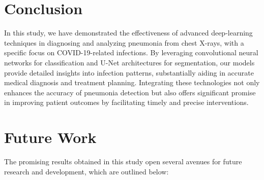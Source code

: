 \documentclass[10pt]{article}
\begin{document}
\section*{Conclusion}
\label{sec:conclusion}
In this study, we have demonstrated the effectiveness of advanced deep-learning techniques in diagnosing and analyzing pneumonia from chest X-rays, with a specific focus on COVID-19-related infections. By leveraging convolutional neural networks for classification and U-Net architectures for segmentation, our models provide detailed insights into infection patterns, substantially aiding in accurate medical diagnosis and treatment planning. Integrating these technologies not only enhances the accuracy of pneumonia detection but also offers significant promise in improving patient outcomes by facilitating timely and precise interventions.

\section*{Future Work}
\label{sec:futurework}
The promising results obtained in this study open several avenues for future research and development, which are outlined below:
\end{document}
